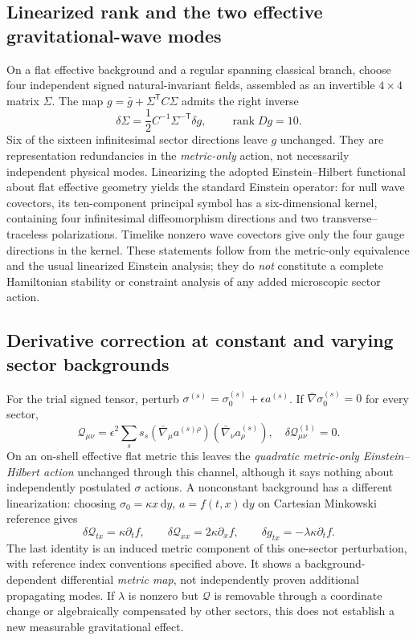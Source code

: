 \documentclass[11pt,a4paper]{article}
\newcommand{\dd}{\mathrm d}
\begin{document}
\subsection{Linearized rank and the two effective gravitational-wave modes}
On a flat effective background and a regular spanning classical branch,
choose four independent signed natural-invariant fields, assembled as an
invertible $4\times4$ matrix $\Sigma$. The map
$g=\bar g+\Sigma^{\mathsf T}C\Sigma$ admits the right inverse
\begin{equation}\label{eq:qgd061-four-right-inverse}
\boxed{\delta\Sigma=\frac12C^{-1}\Sigma^{-\mathsf T}\delta g,
\qquad \operatorname{rank}Dg=10.}
\end{equation}
Six of the sixteen infinitesimal sector directions leave $g$ unchanged.
They are representation redundancies in the \emph{metric-only} action,
not necessarily independent physical modes. Linearizing the adopted
Einstein--Hilbert functional about flat effective geometry yields the standard
Einstein operator: for null wave covectors, its ten-component principal symbol
has a six-dimensional kernel, containing four infinitesimal diffeomorphism
directions and two transverse--traceless polarizations. Timelike nonzero wave
covectors give only the four gauge directions in the kernel. These statements
follow from the metric-only equivalence and the usual linearized Einstein
analysis; they do \emph{not} constitute a complete Hamiltonian stability or
constraint analysis of any added microscopic sector action.

\subsection{Derivative correction at constant and varying sector backgrounds}
For the trial signed tensor, perturb
$\sigma^{(s)}=\sigma^{(s)}_0+\epsilon a^{(s)}$.
If $\bar\nabla\sigma_0^{(s)}=0$ for every sector,
\begin{equation}\label{eq:qgd061-Q-order}
\boxed{\mathcal Q_{\mu\nu}=\epsilon^2\sum_s s_s
(\bar\nabla_\mu a^{(s)\rho})(\bar\nabla_\nu a^{(s)}_\rho),
\quad \delta\mathcal Q_{\mu\nu}^{(1)}=0.}
\end{equation}
On an on-shell effective flat metric this leaves the \emph{quadratic metric-only
Einstein--Hilbert action} unchanged through this channel, although it says
nothing about independently postulated $\sigma$ actions. A nonconstant
background has a different linearization: choosing
$\sigma_0=\kappa x\,\dd y$, $a=f(t,x)\,\dd y$ on Cartesian Minkowski
reference gives
\begin{equation}\label{eq:qgd061-Q-varying}
\boxed{\delta\mathcal Q_{tx}=\kappa\partial_t f,
\qquad \delta\mathcal Q_{xx}=2\kappa\partial_x f,
\qquad \delta g_{tx}=-\lambda\kappa\partial_t f.}
\end{equation}
The last identity is an induced metric component of this one-sector
perturbation, with reference index conventions specified above. It shows a
background-dependent differential \emph{metric map}, not independently proven
additional propagating modes. If $\lambda$ is nonzero but $\mathcal Q$ is
removable through a coordinate change or algebraically compensated by other
sectors, this does not establish a new measurable gravitational effect.
\end{document}
